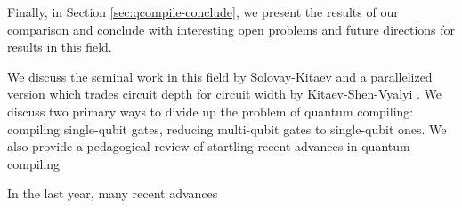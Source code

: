 Finally, in Section \ref{sec:qcompile-conclude}, we present the results of
our comparison and conclude with interesting open problems and
future directions for results in this field.

We discuss the seminal work
in this field by Solovay-Kitaev \cite{Solovay1995} and a
parallelized version which trades circuit depth for circuit width
by Kitaev-Shen-Vyalyi \cite{Kitaev2002}. We discuss two primary
ways to divide up the problem of quantum compiling: 
compiling single-qubit gates, reducing multi-qubit gates to
single-qubit ones. We also provide a pedagogical review of
startling recent advances in quantum compiling

In the last year, many recent advances







